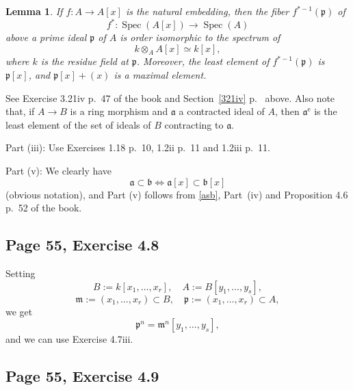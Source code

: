 \documentclass[parskip=half,fontsize=12pt]{scrartcl}%
\newcommand{\oo}{\operatorname}\newcommand{\ooo}{\operatorname*}
\newcommand{\mf}{\mathfrak}
\newcommand{\aaa}{\mf a}
\newcommand{\bbb}{\mf b}
\newcommand{\mmm}{\mf m}
\newcommand{\ppp}{\mf p}
\newcommand{\Spec}{\operatorname{Spec}}\newcommand{\Sp}{\operatorname{Spec}}
\newtheorem{lem}[thm]{Lemma}
\begin{document}
\begin{lem}\label{fiberx}
If $f:A\to A[x]$ is the natural embedding, %
then the fiber $f^{*-1}(\ppp)$ of 
$$
f^*:\Spec(A[x])\to\Spec(A)
$$ 
above a prime ideal $\ppp$ of $A$ is order isomorphic to the spectrum of 
$$
k\otimes_AA[x]\simeq k[x],
$$ 
where $k$ is the residue field at $\ppp$. %
Moreover, the least element of $f^{*-1}(\ppp)$ is $\ppp[x]$, and $\ppp[x]+(x)$ is a maximal element.
\end{lem}

See Exercise 3.21iv p.~47 of the book and Section~\ref{321iv} p.~\pageref{321iv} above. Also note that, if $A\to B$ is a ring morphism and $\aaa$ a contracted ideal of $A$, then $\aaa^{\oo e}$ is the least element of the set of ideals of $B$ contracting to $\aaa$.

Part (iii): Use Exercises 1.18 p.~10, 1.2ii p.~11 and 1.2iii p.~11. %


Part (v): We clearly have 
\begin{equation}\label{asb}
\aaa\subset\bbb\iff\aaa[x]\subset\bbb[x]
\end{equation}
(obvious notation), and Part (v) follows from \eqref{asb}, Part~(iv) and Proposition 4.6 p.~52 of the book.

\subsection{Page 55, Exercise 4.8}%

Setting 
$$
B:=k[x_1,\dots,x_r],\quad A:=B[y_1,\dots,y_s],
$$ 
$$
\mmm:=(x_1,\dots,x_r)\subset B,\quad\ppp:=(x_1,\dots,x_r)\subset A,
$$ 
we get 
$$
\ppp^n=\mmm^n[y_1,\dots,y_s],
$$ 
and we can use Exercise 4.7iii.


\subsection{Page 55, Exercise 4.9}%
\end{document}

